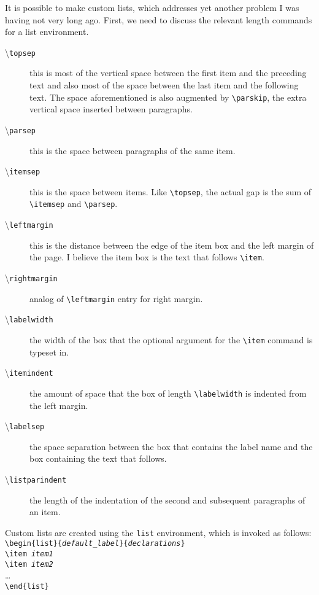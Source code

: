 \documentclass{amsart}
\newcommand{\tbs}{\textbackslash}
\newcommand{\ttt}[1]{\texttt{#1}}
\newcommand{\pqquad}{\phantom{\qquad}}
\begin{document}
	It is possible to make custom lists, which addresses yet another
	problem I was having not very long ago. 
	First, we need to discuss the relevant length commands
	for a list environment.
	\begin{description}
		\item[\textbackslash \texttt{topsep}] 
			this is most of the vertical space between the first item
			and the preceding text and also most of the space between
			the last item and the following text. 
			The space aforementioned is also augmented by 
			\verb+\parskip+, the extra vertical space inserted between
			paragraphs. 
		\item[\textbackslash \texttt{parsep}] 
			this is the space between paragraphs of the same item.
		\item[\textbackslash \texttt{itemsep}]
			this is the space between items. Like \verb+\topsep+, the
			actual gap is the sum of \verb+\itemsep+ and \verb+\parsep+.
		\item[\textbackslash \texttt{leftmargin}]
			this is the distance between the edge of the item box and 
			the left margin of the page. I believe the item box
			is the text that follows \verb+\item+. 
		\item[\textbackslash \texttt{rightmargin}]
			analog of \verb+\leftmargin+ entry for right margin. 
		\item[\textbackslash \texttt{labelwidth}]
			the width of the box that the optional argument for
			the \verb+\item+ command is typeset in. 
		\item[\textbackslash \texttt{itemindent}]
			the amount of space that the box of length \verb+\labelwidth+
			is indented from the left margin. 	
		\item[\textbackslash \texttt{labelsep}]
			the space separation between the box that contains
			the label name and the box containing the text that follows. 
		\item[\textbackslash \texttt{listparindent}]
			the length of the indentation of the second and subsequent
			paragraphs of an item. 
	\end{description}
	
	Custom lists are created using the \verb+list+ environment, which
	is invoked as follows: 
	\ttt{\tbs begin\{list\}\{\emph{default\_label}\}\{\emph{declarations}\}} \\
	\pqquad \ttt{\tbs item \emph{item1}} \\
	\pqquad \ttt{\tbs item \emph{item2}} \\
	\pqquad \dots \\
	\ttt{\tbs end\{list\}}
\end{document}
